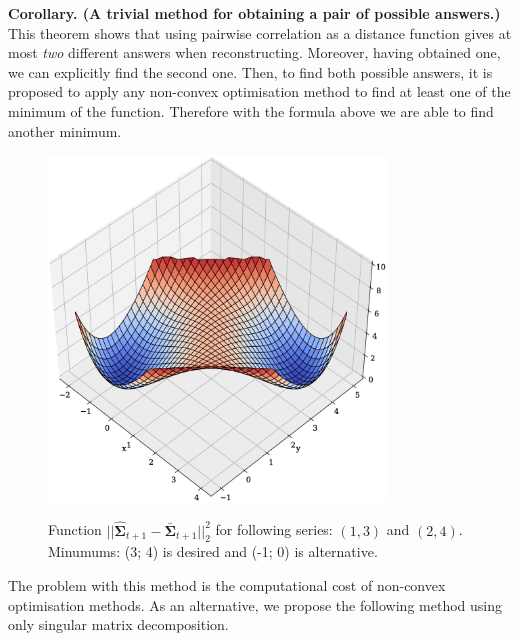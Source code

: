 \documentclass{article}
\begin{document}
\textbf{Corollary. (A trivial method for obtaining a pair of possible answers.)} This theorem shows that using pairwise correlation as a distance function gives at most \textit{two} different answers when reconstructing. Moreover, having obtained one, we can explicitly find the second one. Then, to find both possible answers, it is proposed to apply any non-convex optimisation method to find at least one of the minimum of the function. Therefore with the formula above we are able to find another minimum.

\begin{figure}[H]
	\centering
	\begin{center}
		\includegraphics[width=0.8\textwidth]{NonConvex.eps}
		\label{fig:fig5}
	\end{center}
	\caption{Function $||\hat{\mathbf{\Sigma}}_{t+1} - \bar{\mathbf{\Sigma}}_{t+1}||_2^2$ for following series: $(1, 3)$ and $(2, 4)$. Minumums: (3; 4) is desired and (-1; 0) is alternative.}
\end{figure}


The problem with this method is the computational cost of non-convex optimisation methods. As an alternative, we propose the following method using only singular matrix decomposition.
\end{document}
